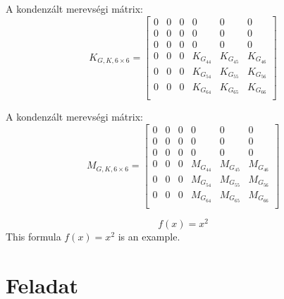 \documentclass{article}
\begin{document}
	A kondenzált merevségi mátrix: 
	\begin{equation}
		K_{G,K,6\times6}=
		\begin{bmatrix}
		0            & 0             & 0             & 0             & 0             & 0            \\
		0            & 0             & 0             & 0             & 0             & 0            \\
		0            & 0             & 0             & 0             & 0             & 0            \\
		0			 & 0			 & 0			 & K_{G_{44}}	 & K_{G_{45}}	 & K_{G_{46}}   \\
		0			 & 0			 & 0			 & K_{G_{54}}	 & K_{G_{55}}	 & K_{G_{56}}   \\
		0			 & 0			 & 0			 & K_{G_{64}}	 & K_{G_{65}}	 & K_{G_{66}}   \\
		\end{bmatrix}
	\end{equation}
	
	A kondenzált merevségi mátrix: 
	\begin{equation}
		M_{G,K,6\times6}=
		\begin{bmatrix}
		0            & 0             & 0             & 0             & 0             & 0            \\
		0            & 0             & 0             & 0             & 0             & 0            \\
		0            & 0             & 0             & 0             & 0             & 0            \\
		0			 & 0			 & 0			 & M_{G_{44}}	 & M_{G_{45}}	 & M_{G_{46}}   \\
		0			 & 0			 & 0			 & M_{G_{54}}	 & M_{G_{55}}	 & M_{G_{56}}   \\
		0			 & 0			 & 0			 & M_{G_{64}}	 & M_{G_{65}}	 & M_{G_{66}}   \\
		\end{bmatrix}
	\end{equation}
	
	
	
	\begin{equation}
	f(x)=x^2
	\end{equation}
	This formula $f(x) = x^2$ is an example.
	
	\section{Feladat}
		
\end{document}
